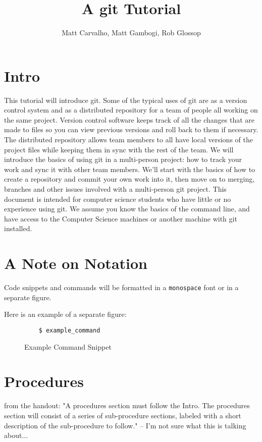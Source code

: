 \documentclass[11pt]{report}
\title{A git Tutorial}
\author{Matt Carvalho, Matt Gambogi, Rob Glossop}
\begin{document}
\thispagestyle{empty}
\maketitle

\clearpage {} 

\tableofcontents

\listoffigures

\clearpage {}
\section{Intro}
This tutorial will introduce git. Some of the typical uses of git are as a version control system and as a distributed repository for a team of people all working on the same project. Version control software keeps track of all the changes that are made to files so you can view previous versions and roll back to them if necessary.  The distributed repository allows team members to all have local versions of the project files while keeping them in sync with the rest of the team. We will introduce the basics of using git in a multi-person project: how to track your work and sync it with other team members. We'll start with
the basics of how to create a repository and commit your own work into
it, then move on to merging, branches and other issues involved with a
multi-person git project. This document is intended for computer science students who have little or no experience using git. We assume you know the basics of the command line, and have access to the Computer Science machines or another machine with git installed.	

\section{A Note on Notation}
Code snippets and commands will be formatted in a \texttt{monospace} font or in
a separate figure.

Here is an example of a separate figure:
\begin{figure}[h]
    \caption{Example Command Snippet}
    \begin{lstlisting}
    $ example_command
    \end{lstlisting}
\end{figure}

\section{Procedures}
from the handout: "A procedures section must follow the Intro. The procedures section will consist of a series of sub-procedure sections, labeled with a short description of the sub-procedure to follow." -- I'm not sure what this is talking about...
\end{document}
